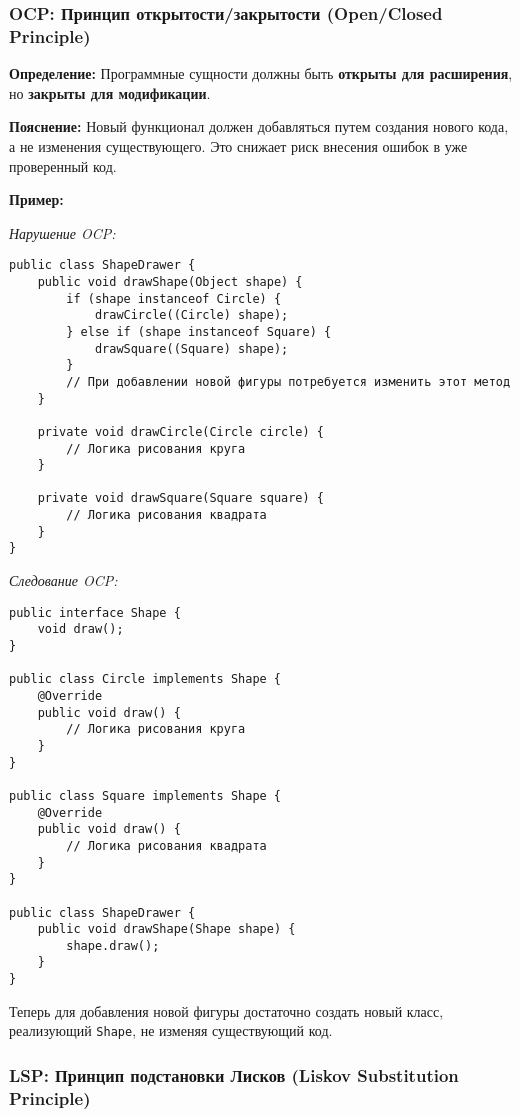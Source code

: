 \subsubsection{OCP: Принцип открытости/закрытости (Open/Closed Principle)}

\textbf{Определение:}
Программные сущности должны быть \textbf{открыты для расширения}, но \textbf{закрыты для модификации}.

\textbf{Пояснение:}
Новый функционал должен добавляться путем создания нового кода, а не изменения существующего. Это снижает риск внесения ошибок в уже проверенный код.

\textbf{Пример:}

\textit{Нарушение OCP:}
\begin{verbatim}
public class ShapeDrawer {
    public void drawShape(Object shape) {
        if (shape instanceof Circle) {
            drawCircle((Circle) shape);
        } else if (shape instanceof Square) {
            drawSquare((Square) shape);
        }
        // При добавлении новой фигуры потребуется изменить этот метод
    }

    private void drawCircle(Circle circle) {
        // Логика рисования круга
    }

    private void drawSquare(Square square) {
        // Логика рисования квадрата
    }
}
\end{verbatim}

\textit{Следование OCP:}
\begin{verbatim}
public interface Shape {
    void draw();
}

public class Circle implements Shape {
    @Override
    public void draw() {
        // Логика рисования круга
    }
}

public class Square implements Shape {
    @Override
    public void draw() {
        // Логика рисования квадрата
    }
}

public class ShapeDrawer {
    public void drawShape(Shape shape) {
        shape.draw();
    }
}
\end{verbatim}

Теперь для добавления новой фигуры достаточно создать новый класс, реализующий \texttt{Shape}, не изменяя существующий код.

\subsubsection{LSP: Принцип подстановки Лисков (Liskov Substitution Principle)}

